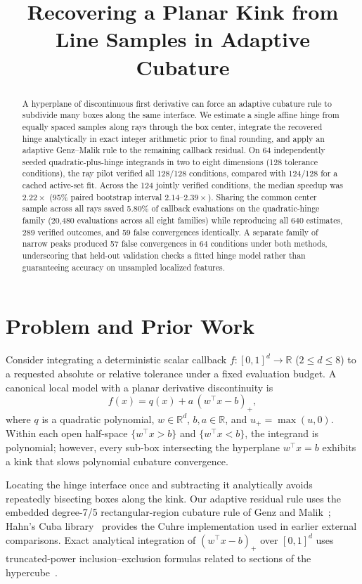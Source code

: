 \documentclass[10pt,letterpaper]{article}
\title{Recovering a Planar Kink from Line Samples in Adaptive Cubature}
\author{}
\date{}
\begin{document}
\maketitle
\vspace{-2.5em}

\begin{abstract}
A hyperplane of discontinuous first derivative can force an adaptive cubature rule to subdivide many boxes along the same interface. We estimate a single affine hinge from equally spaced samples along rays through the box center, integrate the recovered hinge analytically in exact integer arithmetic prior to final rounding, and apply an adaptive Genz--Malik rule to the remaining callback residual. On 64 independently seeded quadratic-plus-hinge integrands in two to eight dimensions (128 tolerance conditions), the ray pilot verified all 128/128 conditions, compared with 124/128 for a cached active-set fit. Across the 124 jointly verified conditions, the median speedup was $2.22\times$ (95\% paired bootstrap interval $2.14\text{--}2.39\times$). Sharing the common center sample across all rays saved 5.80\% of callback evaluations on the quadratic-hinge family (20,480 evaluations across all eight families) while reproducing all 640 estimates, 289 verified outcomes, and 59 false convergences identically. A separate family of narrow peaks produced 57 false convergences in 64 conditions under both methods, underscoring that held-out validation checks a fitted hinge model rather than guaranteeing accuracy on unsampled localized features.
\end{abstract}

\section{Problem and Prior Work}

Consider integrating a deterministic scalar callback $f\colon [0,1]^d \to \mathbb{R}$ ($2 \leq d \leq 8$) to a requested absolute or relative tolerance under a fixed evaluation budget. A canonical local model with a planar derivative discontinuity is
\[
f(x) = q(x) + a\,(w^\top x - b)_+,
\]
where $q$ is a quadratic polynomial, $w \in \mathbb{R}^d$, $b,a \in \mathbb{R}$, and $u_+ = \max(u, 0)$. Within each open half-space $\{w^\top x > b\}$ and $\{w^\top x < b\}$, the integrand is polynomial; however, every sub-box intersecting the hyperplane $w^\top x = b$ exhibits a kink that slows polynomial cubature convergence.

Locating the hinge interface once and subtracting it analytically avoids repeatedly bisecting boxes along the kink. Our adaptive residual rule uses the embedded degree-7/5 rectangular-region cubature rule of Genz and Malik~\cite{genz1980}; Hahn's Cuba library~\cite{hahn2005} provides the Cuhre implementation used in earlier external comparisons. Exact analytical integration of $(w^\top x - b)_+$ over $[0,1]^d$ uses truncated-power inclusion--exclusion formulas related to sections of the hypercube~\cite{marichal2008}.
\end{document}
